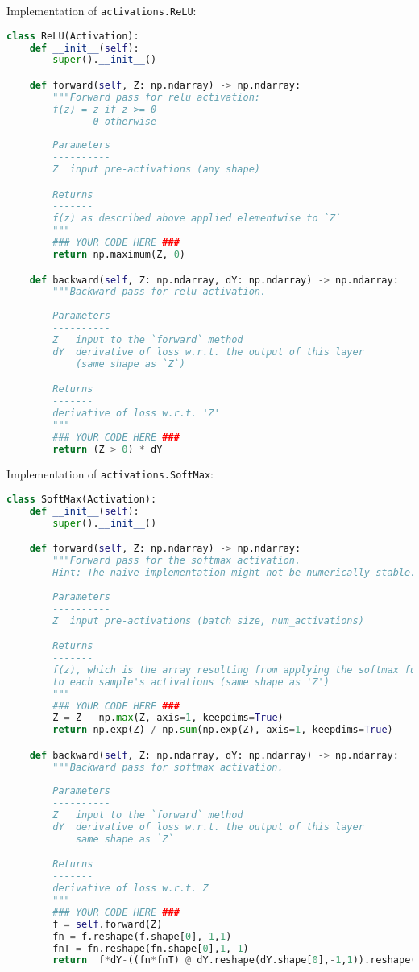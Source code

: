 Implementation of \texttt{activations.ReLU}:

\begin{lstlisting}[language=Python]
class ReLU(Activation):
    def __init__(self):
        super().__init__()

    def forward(self, Z: np.ndarray) -> np.ndarray:
        """Forward pass for relu activation:
        f(z) = z if z >= 0
               0 otherwise
        
        Parameters
        ----------
        Z  input pre-activations (any shape)

        Returns
        -------
        f(z) as described above applied elementwise to `Z`
        """
        ### YOUR CODE HERE ###
        return np.maximum(Z, 0)

    def backward(self, Z: np.ndarray, dY: np.ndarray) -> np.ndarray:
        """Backward pass for relu activation.
        
        Parameters
        ----------
        Z   input to the `forward` method
        dY  derivative of loss w.r.t. the output of this layer
            (same shape as `Z`)

        Returns
        -------
        derivative of loss w.r.t. 'Z'
        """
        ### YOUR CODE HERE ###
        return (Z > 0) * dY

\end{lstlisting}

Implementation of \texttt{activations.SoftMax}:

\begin{lstlisting}[language=Python]
class SoftMax(Activation):
    def __init__(self):
        super().__init__()

    def forward(self, Z: np.ndarray) -> np.ndarray:
        """Forward pass for the softmax activation.
        Hint: The naive implementation might not be numerically stable.
        
        Parameters
        ----------
        Z  input pre-activations (batch size, num_activations)

        Returns
        -------
        f(z), which is the array resulting from applying the softmax function
        to each sample's activations (same shape as 'Z')
        """
        ### YOUR CODE HERE ###
        Z = Z - np.max(Z, axis=1, keepdims=True)
        return np.exp(Z) / np.sum(np.exp(Z), axis=1, keepdims=True)

    def backward(self, Z: np.ndarray, dY: np.ndarray) -> np.ndarray:
        """Backward pass for softmax activation.
        
        Parameters
        ----------
        Z   input to the `forward` method
        dY  derivative of loss w.r.t. the output of this layer
            same shape as `Z`

        Returns
        -------
        derivative of loss w.r.t. Z
        """
        ### YOUR CODE HERE ###
        f = self.forward(Z)
        fn = f.reshape(f.shape[0],-1,1)
        fnT = fn.reshape(fn.shape[0],1,-1)
        return  f*dY-((fn*fnT) @ dY.reshape(dY.shape[0],-1,1)).reshape(f.shape[0],-1)

\end{lstlisting}


